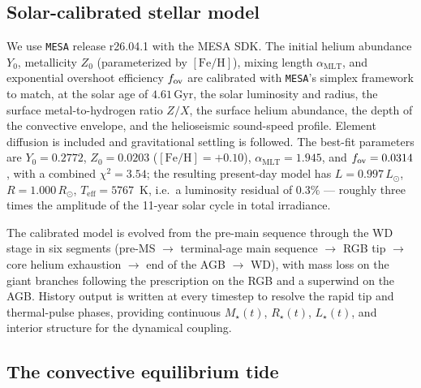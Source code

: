 \documentclass[twocolumn]{aastex631}
\newcommand{\rsun}{R_\odot}
\newcommand{\lsun}{L_\odot}
\newcommand{\teff}{T_{\mathrm{eff}}}
\newcommand{\gyr}{\,\mathrm{Gyr}}
\newcommand{\code}[1]{\texttt{#1}}
\begin{document}
\subsection{Solar-calibrated stellar model}

We use \code{MESA} release r26.04.1 with the MESA SDK. The initial helium
abundance $Y_0$, metallicity $Z_0$ (parameterized by $[\mathrm{Fe/H}]$), mixing
length $\alpha_{\mathrm{MLT}}$, and exponential overshoot efficiency $f_{\rm ov}$
are calibrated with \code{MESA}'s simplex framework to match, at the solar age of
$4.61\gyr$, the solar luminosity and radius, the surface metal-to-hydrogen ratio
$Z/X$, the surface helium abundance, the depth of the convective envelope, and the
helioseismic sound-speed profile. Element diffusion is included and gravitational
settling is followed. The best-fit parameters are $Y_0=0.2772$, $Z_0=0.0203$
($[\mathrm{Fe/H}]=+0.10$), $\alpha_{\mathrm{MLT}}=1.945$, and $f_{\rm ov}=0.0314$,
with a combined $\chi^2=3.54$; the resulting present-day model has
$L=0.997\,\lsun$, $R=1.000\,\rsun$, $\teff=5767$~K, i.e.\ a luminosity residual of
$0.3\%$ --- roughly three times the amplitude of the 11-year solar cycle in total
irradiance.

The calibrated model is evolved from the pre-main sequence through the WD stage in
six segments (pre-MS $\to$ terminal-age main sequence $\to$ RGB tip $\to$ core
helium exhaustion $\to$ end of the AGB $\to$ WD), with mass loss on the giant
branches following the \citet{Reimers1975} prescription on the RGB and a
\citet{Bloecker1995} superwind on the AGB. History output is written at every
timestep to resolve the rapid tip and thermal-pulse phases, providing continuous
$M_\star(t)$, $R_\star(t)$, $L_\star(t)$, and interior structure for the dynamical
coupling.

\subsection{The convective equilibrium tide}
\label{sec:tide}
\end{document}
